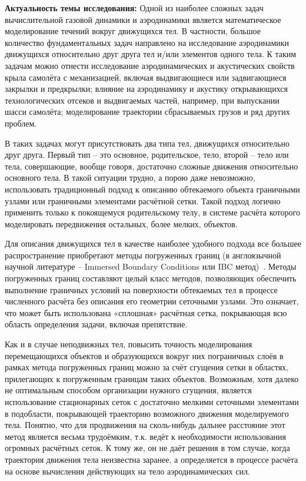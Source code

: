 
{\actuality} \par{\textbf{Актуальность темы исследования:}} 
Одной из наиболее сложных задач вычислительной газовой динамики и аэродинамики является математическое моделирование течений вокруг движущихся тел.
В частности,  большое количество фундаментальных задач направлено на исследование  аэродинамики движущихся относительно друг друга тел и/или элементов одного тела.
К таким задачам можно отнести исследование аэродинамических и акустических свойств крыла самолёта с механизацией, включая выдвигающиеся или задвигающиеся закрылки и предкрылки; влияние на аэродинамику и акустику открывающихся технологических отсеков и выдвигаемых частей, например, при выпускании шасси самолёта; моделирование траектории сбрасываемых грузов и ряд других проблем. 

В таких задачах могут присутствовать два типа тел, движущихся относительно друг друга. Первый тип – это основное, родительское, тело, второй – тело или тела, совершающие, вообще говоря, достаточно сложные движения относительно основного тела. В такой ситуации трудно, а порою даже невозможно, использовать традиционный подход к описанию обтекаемого объекта граничными узлами или граничными элементами расчётной сетки. Такой подход логично применить только к покоящемуся родительскому телу, в системе расчёта которого моделировать передвижения остальных, более мелких, объектов. 

Для описания движущихся тел в качестве наиболее удобного подхода все большее распространение приобретают методы погруженных границ (в англоязычной научной литературе – Immersed Boundary Conditions или IBC метод)~\cite{mittal2005immersed, boiron2009high, brown2014characteristic}.
Методы погруженных границ составляют целый класс методов, позволяющих обеспечить выполнение граничных условий на поверхности обтекаемых тел в процессе численного расчёта без описания его геометрии сеточными узлами. Это означает, что может быть использована «сплошная» расчётная сетка, покрывающая всю область определения задачи, включая препятствие. 

Как и в случае неподвижных тел, повысить точность моделирования перемещающихся объектов и образующихся вокруг них пограничных слоёв в рамках метода погруженных границ можно за счёт сгущения сетки в областях, прилегающих к погруженным границам таких объектов. Возможным, хотя далеко не оптимальным способом  организации нужного сгущения, является использование стационарных сеток с достаточно мелкими сеточными элементами в подобласти, покрывающей траекторию возможного движения моделируемого тела. Понятно, что для продвижения на сколь-нибудь дальнее расстояние этот метод является весьма трудоёмким, т.к. ведёт к необходимости использования огромных расчётных сеток. К тому же, он не даёт решения в том случае, когда траектория движения тела неизвестна заранее, а определяется в процессе расчёта на основе вычисления действующих на тело аэродинамических сил. 

